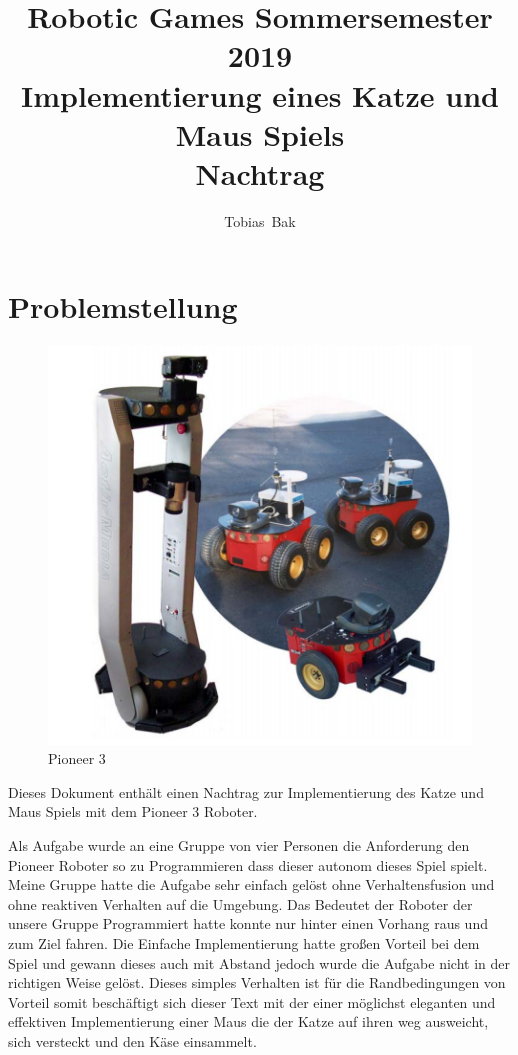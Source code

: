 \documentclass[11pt,a4paper]{article}
\title{Robotic Games Sommersemester 2019\\ Implementierung eines Katze und Maus Spiels\\ Nachtrag}
\author{Tobias~Bak}
\begin{document}
\maketitle
\section{Problemstellung}
\begin{figure}
\centering
\includegraphics[scale=0.45]{media/titelbild.png}
\caption{Pioneer 3 \cite{pioneer} }
\end{figure}
Dieses Dokument enthält einen Nachtrag zur Implementierung des Katze und Maus Spiels mit dem Pioneer 3 Roboter.\cite{pioneer}

Als Aufgabe wurde an eine Gruppe von vier Personen die Anforderung den Pioneer Roboter so zu Programmieren dass dieser autonom dieses Spiel spielt. Meine Gruppe hatte die Aufgabe sehr einfach gelöst ohne Verhaltensfusion und ohne reaktiven Verhalten auf die Umgebung. Das Bedeutet der Roboter der unsere Gruppe Programmiert hatte konnte nur hinter einen Vorhang raus und zum Ziel fahren. Die Einfache Implementierung hatte großen Vorteil bei dem Spiel und gewann dieses auch mit Abstand jedoch wurde die Aufgabe nicht in der richtigen Weise gelöst. Dieses simples Verhalten ist für die Randbedingungen von Vorteil somit beschäftigt sich dieser Text mit der einer möglichst eleganten und effektiven Implementierung einer Maus die der Katze auf ihren weg ausweicht, sich versteckt und den Käse einsammelt. 
\end{document}

